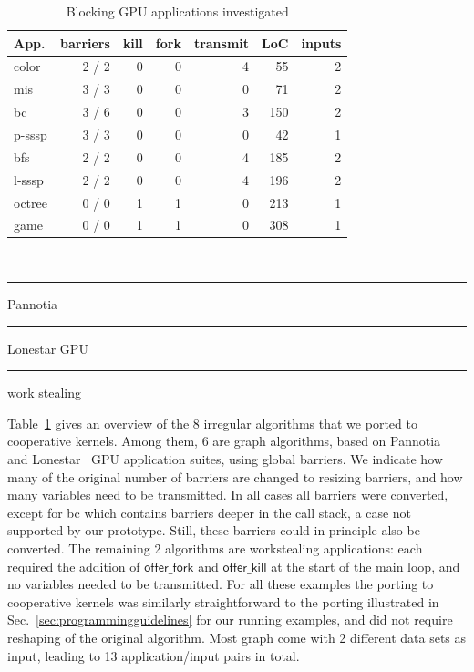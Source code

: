 \documentclass[numbers,nocopyrightspace,10pt]{sigplanconf}
\newcommand\crule[3][black]{\textcolor{#1}{\rule{#2}{#3}}}
\newcommand{\mytablong}{Table~}
\newcommand{\mysec}{Sec.~}
\newcommand{\offerfork}{\mathsf{offer\_fork}}
\newcommand{\offerkill}{\mathsf{offer\_kill}}
\begin{document}
\begin{table}
\small
\centering
\begin{tabular}{ l r r r r r r}
App. & barriers & kill & fork & transmit & LoC & inputs\\
\hline
\rowcolor{Gray1}
color & 2 / 2 & 0 & 0 & 4 & 55 & 2\\
\rowcolor{Gray1}
mis & 3 / 3 & 0 & 0 & 0 & 71 & 2\\
\rowcolor{Gray1}
bc & 3 / 6 & 0 & 0 & 3 & 150 & 2\\
\rowcolor{Gray1}
p-sssp & 3 / 3 & 0 & 0 & 0  & 42 & 1\\
\rowcolor{Gray2}
bfs & 2 / 2 & 0 & 0  & 4  & 185 & 2\\
\rowcolor{Gray2}
l-sssp & 2 / 2 & 0 & 0  & 4  & 196 & 2\\
\rowcolor{Gray3}
octree & 0 / 0 & 1 & 1 & 0 & 213 & 1 \\
\rowcolor{Gray3}
game & 0 / 0 & 1 & 1 & 0 & 308 & 1 \\
\end{tabular} \\
\vspace{.2cm}
\crule[Gray1]{.2cm}{.2cm} Pannotia \hspace{.4cm} \crule[Gray2]{.2cm}{.2cm} Lonestar GPU  \hspace{.4cm}  \crule[Gray3]{.2cm}{.2cm} work stealing
\caption{Blocking GPU applications investigated}
\label{tab:applications}
\end{table}

\mytablong\ref{tab:applications} gives an overview of the 8 irregular
algorithms that we ported to cooperative kernels. Among them, 6 are
graph algorithms, based on Pannotia~\cite{Pannotia} and
Lonestar~\cite{BNP12} GPU application suites, using global barriers.  We
indicate how many of the original number of barriers are changed to
resizing barriers, and how many variables need to be transmitted.  In
all cases all barriers were converted, except for bc which contains
barriers deeper in the call stack, a case not supported by our
prototype. Still, these barriers could in principle also be
converted. The remaining 2 algorithms are workstealing applications:
each required the addition of $\offerfork$ and $\offerkill$ at the start
of the main loop, and no variables needed to be transmitted.  For all
these examples the porting to cooperative kernels was similarly
straightforward to the porting illustrated in
\mysec\ref{sec:programmingguidelines} for our running examples, and did
not require reshaping of the original algorithm. Most graph come with 2
different data sets as input, leading to 13 application/input pairs in
total.
\end{document}
